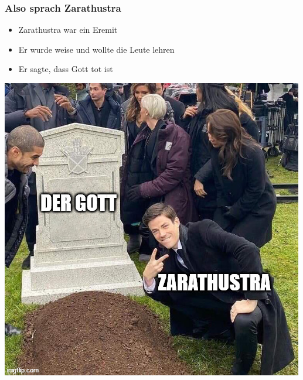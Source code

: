 \documentclass{beamer}
\begin{document}
\begin{frame}
\frametitle{Also sprach Zarathustra}
\begin{minipage}{.49\textwidth}
\begin{itemize}
\item Zarathustra war ein Eremit
\item Er wurde weise und wollte die Leute lehren
\item Er sagte, dass Gott tot ist
\end{itemize}
\end{minipage}
\begin{minipage}{.49\textwidth}
\includegraphics[width=\textwidth]{gottisttot.jpg}
\end{minipage}
\end{frame}
\end{document}
